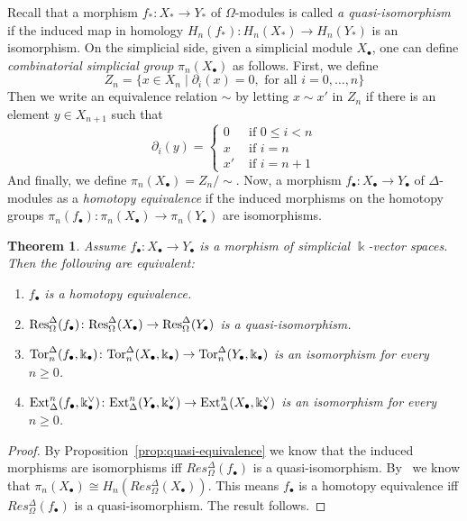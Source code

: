 \documentclass[a4paper,11pt]{amsart}
\newtheorem{theorem}{Theorem}[section]
\theoremstyle{definition}
\newcommand{\Tor}{\text{\rm Tor}}
\newcommand{\Res}{\text{\rm Res}}
\newcommand{\Ext}{\text{\rm Ext}}
\newcommand{\Simp}{{\Delta}}
\newcommand{\Diff}{{\Omega}}
\begin{document}
Recall that a morphism $f_*\colon X_*\to Y_*$ of $\Diff$-modules is called \emph{a quasi-isomorphism} if the induced map in homology $H_n(f_*)\colon H_n(X_*)\to H_n(Y_*)$ is an isomorphism.  On the simplicial side, given a simplicial module $X_\bullet$, one can define \emph{combinatorial simplicial group} $\pi_n(X_\bullet)$ as follows. First, we define
\[ Z_n = \{ x\in X_n\mid \partial_i(x)=0, \text{ for all } i=0,\ldots,n\} \] 
Then we write an equivalence relation $\sim$ by letting $x\sim x'$ in $Z_n$ if there is an element $y\in X_{n+1}$ such that
\[ \partial_i(y) =
  \begin{cases}
    0 & \text{ if } 0\leq i< n\\
    x & \text{ if } i=n\\
    x' & \text{ if } i=n+1
  \end{cases}\] And finally, we define $\pi_n(X_\bullet) = Z_n/\!\!\sim$.  Now, a morphism
$f_\bullet\colon X_\bullet\to Y_\bullet$ of $\Simp$-modules as a \emph{homotopy equivalence} if the induced morphisms on the homotopy groups $\pi_n(f_\bullet)\colon \pi_n(X_\bullet)\to \pi_n(Y_\bullet)$ are isomorphisms.

\begin{theorem}\label{thm:TorExt}
  Assume $f_\bullet\colon X_\bullet\to Y_\bullet$ is a morphism of simplicial $\Bbbk$-vector spaces. Then the following are equivalent:
  \begin{enumerate}
      \item $f_\bullet$ is a homotopy equivalence.
      \item $\Res^{\Simp}_{\Diff}(f_\bullet)\colon \Res^{\Simp}_{\Diff}(X_\bullet)\to \Res^{\Simp}_{\Diff}(Y_\bullet)$  is a quasi-isomorphism.
      \item $\Tor^{\Simp}_n(f_\bullet,\Bbbk_\bullet)\colon \Tor^{\Simp}_n(X_\bullet,\Bbbk_\bullet) \to \Tor^{\Simp}_n(Y_\bullet,\Bbbk_\bullet)$ is an isomorphism for every $n\geq 0$.
      \item $\Ext_{\Simp}^n(f_\bullet,\Bbbk_\bullet^\vee)\colon \Ext_{\Simp}^n(Y_\bullet,\Bbbk_\bullet^\vee) \to \Ext_{\Simp}^n(X_\bullet,\Bbbk_\bullet^\vee)$ is an isomorphism for every $n\geq 0$.
  \end{enumerate}
\end{theorem}

\begin{proof}
  By Proposition~\ref{prop:quasi-equivalence} we know that the induced morphisms are isomorphisms iff $Res^{\Simp}_{\Diff}(f_\bullet)$ is a quasi-isomorphism. By~\cite[Thm 8.3.8]{Weibel:HomologicalAlgebra} we know that   $\pi_n(X_\bullet)\cong H_n(Res^{\Simp}_{\Diff}(X_\bullet))$. This means $f_\bullet$ is a homotopy equivalence iff $Res^{\Simp}_{\Diff}(f_\bullet)$ is a quasi-isomorphism.  The result follows.
\end{proof}
\end{document}
